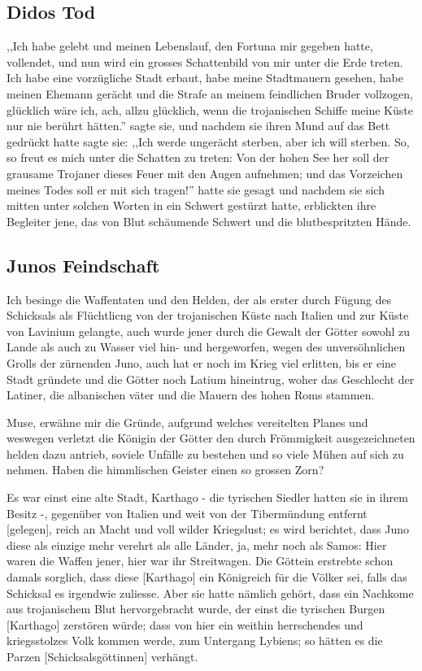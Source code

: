 \documentclass[a4paper]{article}
\begin{document}
\subsection{Didos Tod}
,,Ich habe gelebt und meinen Lebenslauf, den Fortuna mir gegeben hatte, vollendet, und nun wird ein grosses Schattenbild von mir unter die Erde treten. Ich habe eine vorzügliche Stadt erbaut, habe meine Stadtmauern gesehen, habe meinen Ehemann gerächt und die Strafe an meinem feindlichen Bruder vollzogen, glücklich wäre ich, ach, allzu glücklich, wenn die trojanischen Schiffe meine Küste nur nie berührt hätten.'' sagte sie, und nachdem sie ihren Mund auf das Bett gedrückt hatte sagte sie: ,,Ich werde ungerächt sterben, aber ich will sterben. So, so freut es mich unter die Schatten zu treten: Von der hohen See her soll der grausame Trojaner dieses Feuer mit den Augen aufnehmen; und das Vorzeichen meines Todes soll er mit sich tragen!'' hatte sie gesagt und nachdem sie sich mitten unter solchen Worten in ein Schwert gestürzt hatte, erblickten ihre Begleiter jene, das von Blut schäumende Schwert und die blutbespritzten Hände.

\subsection{Junos Feindschaft}
Ich besinge die Waffentaten und den Helden, der als erster durch Fügung des Schicksals als Flüchtlicng von der trojanischen Küste nach Italien und zur Küste von Lavinium gelangte, auch wurde jener durch die Gewalt der Götter sowohl zu Lande als auch zu Wasser viel hin- und hergeworfen, wegen des unversöhnlichen Grolls der zürnenden Juno, auch hat er noch im Krieg viel erlitten, bis er eine Stadt gründete und die Götter noch Latium hineintrug, woher das Geschlecht der Latiner, die albanischen väter und die Mauern des hohen Roms stammen.

Muse, erwähne mir die Gründe, aufgrund welches vereitelten Planes und weswegen verletzt die Königin der Götter den durch Frömmigkeit ausgezeichneten helden dazu antrieb, soviele Unfälle zu bestehen und so viele Mühen auf sich zu nehmen. Haben die himmlischen Geister einen so grossen Zorn?

Es war einst eine alte Stadt, Karthago - die tyrischen Siedler hatten sie in ihrem Besitz -, gegenüber von Italien und weit von der Tibermündung entfernt [gelegen], reich an Macht und voll wilder Kriegslust; es wird berichtet, dass Juno diese als einzige mehr verehrt als alle Länder, ja, mehr noch als Samos: Hier waren die Waffen jener, hier war ihr Streitwagen. Die Göttein erstrebte schon damals sorglich, dass diese [Karthago] ein Königreich für die Völker sei, falls das Schicksal es irgendwie zuliesse. Aber sie hatte nämlich gehört, dass ein Nachkome aus trojanischem Blut hervorgebracht wurde, der einst die tyrischen Burgen [Karthago] zerstören würde; dass von hier ein weithin herrschendes und kriegsstolzes Volk kommen werde, zum Untergang Lybiens; so hätten es die Parzen [Schicksalsgöttinnen] verhängt. 
\end{document}
